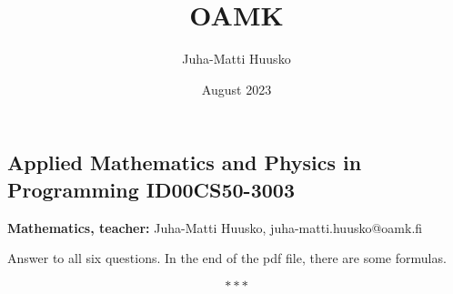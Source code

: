 \documentclass[12pt]{article}
\title{OAMK}
\author{Juha-Matti Huusko}
\date{August 2023}
\begin{document}
\thispagestyle{empty}

\subsection*{Applied Mathematics and Physics in Programming ID00CS50-3003}
\textbf{Mathematics, teacher:} Juha-Matti Huusko, juha-matti.huusko@oamk.fi

\noindent Answer to all six questions. In the end of the pdf file, there are some formulas.

$$
***
$$
\end{document}
